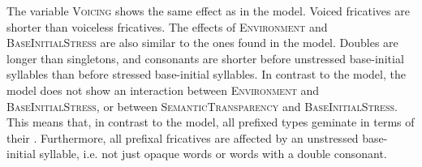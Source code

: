     \begin{table}
    	\caption{Summary of linear model for variables predicting the relative  duration of [s] in prefixed words\label{tbl: summary model5}}
    \end{table}
  
The variable \textsc{Voicing} shows the same effect as in the  model. Voiced fricatives are shorter than voiceless fricatives.
The effects of \textsc{Environment} and \textsc{BaseInitialStress} are also similar to the ones found in the  model. Doubles are longer than singletons, and consonants are shorter before unstressed base-initial syllables than before stressed base-initial syllables. 
In contrast to the  model, the  model does not show an interaction between \textsc{Environment} and \textsc{BaseInitialStress}, or between \textsc{SemanticTransparency} and \textsc{BaseInitialStress}. This means that, in contrast to the  model,  all prefixed types geminate in terms of their . Furthermore, all prefixal fricatives are affected by an unstressed base-initial syllable, i.e. not just opaque words or words with a double consonant.

